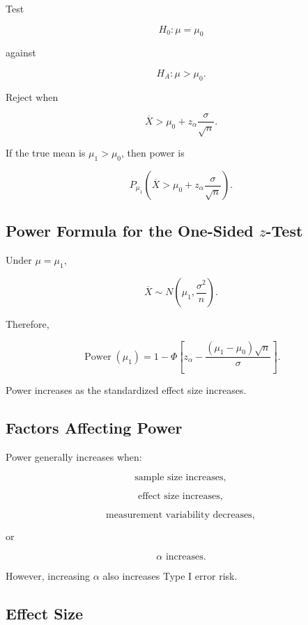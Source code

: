 Test

\[
H_0:\mu=\mu_0
\]

against

\[
H_A:\mu>\mu_0.
\]

Reject when

\[
\overline{X}
>
\mu_0
+
z_\alpha
\frac{\sigma}{\sqrt{n}}.
\]

If the true mean is \(\mu_1>\mu_0\), then power is

\[
\boxed{
P_{\mu_1}
\left(
\overline{X}
>
\mu_0
+
z_\alpha
\frac{\sigma}{\sqrt{n}}
\right).
}
\]

\subsection{Power Formula for the One-Sided \(z\)-Test}
\label{subsec:power-formula-z}

Under \(\mu=\mu_1\),

\[
\overline{X}
\sim
N
\left(
\mu_1,
\frac{\sigma^2}{n}
\right).
\]

Therefore,

\[
\boxed{
\operatorname{Power}(\mu_1)
=
1-
\Phi
\left[
z_\alpha
-
\frac{
(\mu_1-\mu_0)\sqrt{n}
}{
\sigma
}
\right].
}
\]

Power increases as the standardized effect size increases.

\subsection{Factors Affecting Power}
\label{subsec:factors-affecting-power}

Power generally increases when:

\[
\boxed{
\text{sample size increases},
}
\]

\[
\boxed{
\text{effect size increases},
}
\]

\[
\boxed{
\text{measurement variability decreases},
}
\]

or

\[
\boxed{
\alpha\text{ increases}.
}
\]

However, increasing \(\alpha\) also increases Type I error risk.

\subsection{Effect Size}
\label{subsec:effect-size-testing}

